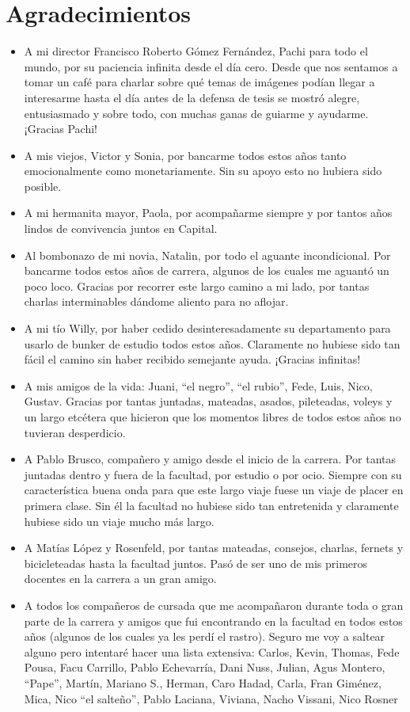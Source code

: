 \chapter*{Agradecimientos}
\begin{itemize}
    \item A mi director Francisco Roberto Gómez Fernández, Pachi para todo el mundo, por su paciencia infinita desde el día cero. Desde que nos sentamos a tomar un café para charlar sobre qué temas de imágenes podían llegar a interesarme hasta el día antes de la defensa de tesis se mostró alegre, entusiasmado y sobre todo, con muchas ganas de guiarme y ayudarme. ¡Gracias Pachi!
    \item A mis viejos, Victor y Sonia, por bancarme todos estos años tanto emocionalmente como monetariamente. Sin su apoyo esto no hubiera sido posible.
    \item A mi hermanita mayor, Paola, por acompañarme siempre y por tantos años lindos de convivencia juntos en Capital.
    \item Al bombonazo de mi novia, Natalin, por todo el aguante incondicional. Por bancarme todos estos años de carrera, algunos de los cuales me aguantó un poco loco. Gracias por recorrer este largo camino a mi lado, por tantas charlas interminables dándome aliento para no aflojar.
    \item A mi tío Willy, por haber cedido desinteresadamente su departamento para usarlo de bunker de estudio todos estos años. Claramente no hubiese sido tan fácil el camino sin haber recibido semejante ayuda. ¡Gracias infinitas!
    \item A mis amigos de la vida: Juani, ``el negro'', ``el rubio'', Fede, Luis, Nico, Gustav. Gracias por tantas juntadas, mateadas, asados, pileteadas, voleys y un largo etcétera que hicieron que los momentos libres de todos estos años no tuvieran desperdicio.
    \item A Pablo Brusco, compañero y amigo desde el inicio de la carrera. Por tantas juntadas dentro y fuera de la facultad, por estudio o por ocio. Siempre con su característica buena onda para que este largo viaje fuese un viaje de placer en primera clase. Sin él la facultad no hubiese sido tan entretenida y claramente hubiese sido un viaje mucho más largo.
    \item A Matías López y Rosenfeld, por tantas mateadas, consejos, charlas, fernets y bicicleteadas hasta la facultad juntos. Pasó de ser uno de mis primeros docentes en la carrera a un gran amigo.
    \item A todos los compañeros de cursada que me acompañaron durante toda o gran parte de la carrera y amigos que fui encontrando en la facultad en todos estos años (algunos de los cuales ya les perdí el rastro). Seguro me voy a saltear alguno pero intentaré hacer una lista extensiva: Carlos, Kevin, Thomas, Fede Pousa, Facu Carrillo, Pablo Echevarría, Dani Nuss, Julian, Agus Montero, ``Pape'', Martín, Mariano S., Herman, Caro Hadad, Carla, Fran Giménez, Mica, Nico ``el salteño'', Pablo Laciana, Viviana, Nacho Vissani, Nico Rosner

\end{itemize}
